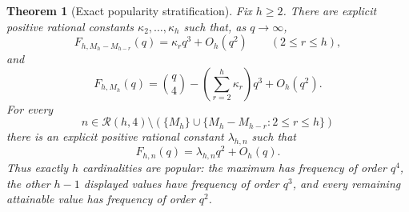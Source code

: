 \documentclass[11pt,reqno]{amsart}
\newtheorem{theorem}{Theorem}[section]
\theoremstyle{definition}
\theoremstyle{remark}
\newcommand{\Rcal}{\mathcal R}
\begin{document}
\begin{theorem}[Exact popularity stratification]\label{thm:popularity}
Fix $h\geq2$.  There are explicit positive rational constants
$\kappa_2,\ldots,\kappa_h$ such that, as $q\to\infty$,
\begin{equation}\label{eq:tailfrequency}
 F_{h,M_h-M_{h-r}}(q)=\kappa_rq^3+O_h(q^2)
 \qquad(2\leq r\leq h),
\end{equation}
and
\begin{equation}\label{eq:maxfrequency}
 F_{h,M_h}(q)=\binom q4-
 \left(\sum_{r=2}^h\kappa_r\right)q^3+O_h(q^2).
\end{equation}
For every
\[
 n\in\Rcal(h,4)\setminus
 \left(\{M_h\}\cup\{M_h-M_{h-r}:2\leq r\leq h\}\right)
\]
there is an explicit positive rational constant $\lambda_{h,n}$ such that
\begin{equation}\label{eq:corefrequency}
 F_{h,n}(q)=\lambda_{h,n}q^2+O_h(q).
\end{equation}
Thus exactly $h$ cardinalities are popular: the maximum has frequency of
order $q^4$, the other $h-1$ displayed values have frequency of order
$q^3$, and every remaining attainable value has frequency of order $q^2$.
\end{theorem}
\end{document}
